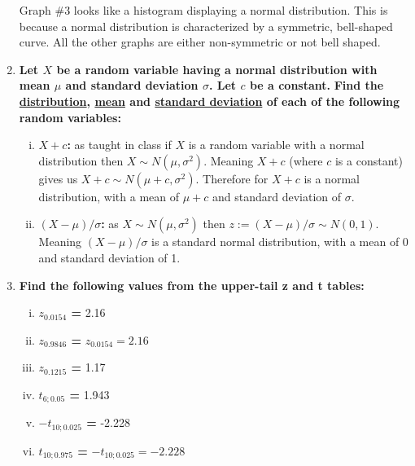 \documentclass{article}
\begin{document}
\begin{enumerate}[1.]
Graph \#3 looks like a histogram displaying a normal distribution. This is because a normal distribution is characterized by a symmetric, bell-shaped curve. All the other graphs are either non-symmetric or not bell shaped. 

\item
\textbf{Let $X$ be a random variable having a normal distribution with mean $\mu$ and standard deviation $\sigma$. Let $c$ be a constant.}
\textbf{Find the \underline{distribution}, \underline{mean} and \underline{standard deviation} of each of the following random variables:}
\begin{enumerate}[(i)]
  \item \textbf{$X + c$: } as taught in class if $X$ is a random variable with a normal distribution then $X \sim N(\mu, \sigma^2)$. Meaning $X + c$ (where $c$ is a constant) gives us $X + c \sim N(\mu + c, \sigma^2)$. Therefore for $X + c$ is a normal distribution, with a mean of $\mu + c$ and standard deviation of $\sigma$. 
  \item \textbf{$(X - \mu)/\sigma$: } as $X \sim N(\mu, \sigma^2)$ then $z := (X - \mu)/\sigma \sim N(0, 1)$. Meaning $(X - \mu)/\sigma$ is a standard normal distribution, with a mean of 0 and standard deviation of 1.
\end{enumerate}

\item
\textbf{Find the following values from the upper-tail z and t tables:}
\begin{enumerate}[(i)]
  \item \textbf{$z_{0.0154}$ = } 2.16
  \item \textbf{$z_{0.9846}$ = } $z_{0.0154} = 2.16$
  \item \textbf{$z_{0.1215}$ = } 1.17
  \item \textbf{$t_{6;0.05}$ = } 1.943
  \item \textbf{$-t_{10;0.025}$ = } -2.228
  \item \textbf{$t_{10;0.975}$ = } $-t_{10;0.025} = -2.228$ 
\end{enumerate}


\end{enumerate}
\end{document}
